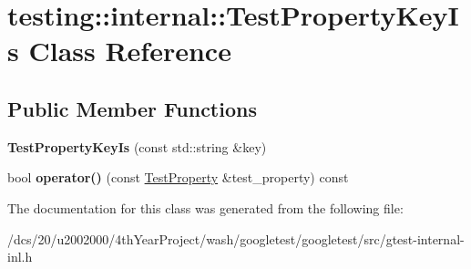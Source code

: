\hypertarget{classtesting_1_1internal_1_1TestPropertyKeyIs}{}\section{testing\+:\+:internal\+:\+:Test\+Property\+Key\+Is Class Reference}
\label{classtesting_1_1internal_1_1TestPropertyKeyIs}
\subsection*{Public Member Functions}
\begin{DoxyCompactItemize}
\item 
\mbox{\label{classtesting_1_1internal_1_1TestPropertyKeyIs_a509ed1271caa1032e40c5d811b3da385}} 
{\bfseries Test\+Property\+Key\+Is} (const std\+::string \&key)
\item 
\mbox{\label{classtesting_1_1internal_1_1TestPropertyKeyIs_abf5eb5bf22065e0614ffe36d093e885e}} 
bool {\bfseries operator()} (const \mbox{\hyperlink{classtesting_1_1TestProperty}{Test\+Property}} \&test\+\_\+property) const
\end{DoxyCompactItemize}


The documentation for this class was generated from the following file\+:\begin{DoxyCompactItemize}
\item 
/dcs/20/u2002000/4th\+Year\+Project/wash/googletest/googletest/src/gtest-\/internal-\/inl.\+h\end{DoxyCompactItemize}
